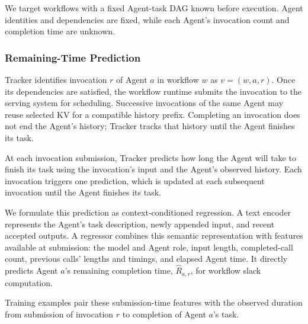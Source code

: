 We target workflows with a fixed Agent-task DAG known before execution.
Agent identities and dependencies are fixed, while each Agent's
invocation count and completion time are unknown.

\subsubsection{Remaining-Time Prediction}
\label{sec:tracker-prediction}

Tracker identifies invocation $r$ of Agent $a$ in workflow $w$ as
$v=(w,a,r)$. Once its dependencies are satisfied, the workflow runtime
submits the invocation to the serving system for scheduling. Successive
invocations of the same Agent may reuse selected KV for a compatible
history prefix. Completing an invocation does not end the Agent's
history; Tracker tracks that history until the Agent finishes its task.

At each invocation submission, Tracker predicts how long the Agent will
take to finish its task using the invocation's input and the Agent's
observed history. Each invocation triggers one prediction, which is
updated at each subsequent invocation until the Agent finishes its task.

We formulate this prediction as context-conditioned regression. A text
encoder represents the Agent's task description, newly appended input,
and recent accepted outputs. A regressor combines this semantic
representation with features available at submission: the model and
Agent role, input length, completed-call count, previous calls' lengths
and timings, and elapsed Agent time. It directly predicts Agent $a$'s
remaining completion time, $\widehat R_{a,r}$, for workflow slack
computation.

Training examples pair these submission-time features with the observed
duration from submission of invocation $r$ to completion of Agent $a$'s
task.

